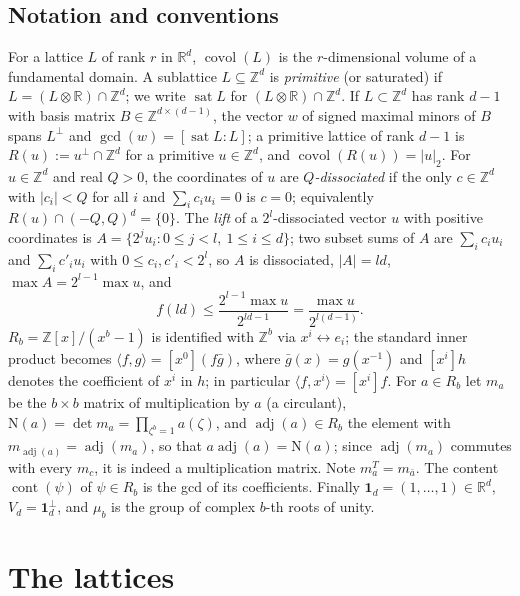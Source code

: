 \documentclass[12pt]{article}
\newcommand{\Z}{\mathbb{Z}}
\newcommand{\R}{\mathbb{R}}
\newcommand{\covol}{\operatorname{covol}}
\newcommand{\cont}{\operatorname{cont}}
\newcommand{\adj}{\operatorname{adj}}
\newcommand{\sat}{\operatorname{sat}}
\newcommand{\Nm}{\mathrm{N}}
\newcommand{\one}{\mathbf{1}}
\newcommand{\dcube}[1]{(-#1,#1)}
\begin{document}
\subsection{Notation and conventions}\label{sec:notation}
For a lattice $L$ of rank $r$ in $\R^d$, $\covol(L)$ is the $r$-dimensional volume of a fundamental domain.
A sublattice $L\subseteq\Z^d$ is \emph{primitive} (or saturated) if $L=(L\otimes\R)\cap\Z^d$; we write
$\sat L$ for $(L\otimes\R)\cap\Z^d$. If $L\subset\Z^d$ has rank $d-1$ with basis matrix $B\in\Z^{d\times(d-1)}$, the
vector $w$ of signed maximal minors of $B$ spans $L^\perp$ and $\gcd(w)=[\sat L:L]$; a primitive lattice of rank $d-1$
is $R(u):=u^\perp\cap\Z^d$ for a primitive $u\in\Z^d$, and $\covol(R(u))=|u|_2$.
For $u\in\Z^d$ and real $Q>0$, the coordinates of $u$ are \emph{$Q$-dissociated} if the only $c\in\Z^d$ with $|c_i|<Q$
for all $i$ and $\sum_ic_iu_i=0$ is $c=0$; equivalently $R(u)\cap\dcube Q^d=\{0\}$.
The \emph{lift} of a $2^l$-dissociated vector $u$ with positive coordinates is
$A=\{2^ju_i:0\le j<l,\ 1\le i\le d\}$; two subset sums of $A$ are $\sum_ic_iu_i$ and $\sum_ic'_iu_i$ with
$0\le c_i,c'_i<2^l$, so $A$ is dissociated, $|A|=ld$, $\max A=2^{l-1}\max u$, and
\begin{equation}\label{eq:lift}
 f(ld)\le\frac{2^{l-1}\max u}{2^{ld-1}}=\frac{\max u}{2^{l(d-1)}} .
\end{equation}
$R_b=\Z[x]/(x^b-1)$ is identified with $\Z^b$ via $x^i\leftrightarrow e_i$; the standard inner product becomes
$\langle f,g\rangle=[x^0](f\bar g)$, where $\bar g(x)=g(x^{-1})$ and $[x^i]h$ denotes the coefficient of $x^i$ in $h$;
in particular $\langle f,x^i\rangle=[x^i]f$. For $a\in R_b$ let $m_a$ be the $b\times b$ matrix of multiplication by $a$
(a circulant), $\Nm(a)=\det m_a=\prod_{\zeta^b=1}a(\zeta)$, and $\adj(a)\in R_b$ the element with $m_{\adj(a)}=\adj(m_a)$,
so that $a\adj(a)=\Nm(a)$; since $\adj(m_a)$ commutes with every $m_c$, it is indeed a multiplication matrix.
Note $m_a^{T}=m_{\bar a}$. The content $\cont(\psi)$ of $\psi\in R_b$ is the gcd of its coefficients.
Finally $\one_d=(1,\dots,1)\in\R^d$, $V_d=\one_d^\perp$, and $\mu_b$ is the group of complex $b$-th roots of unity.

\section{The lattices}\label{sec:lattices}
\end{document}
